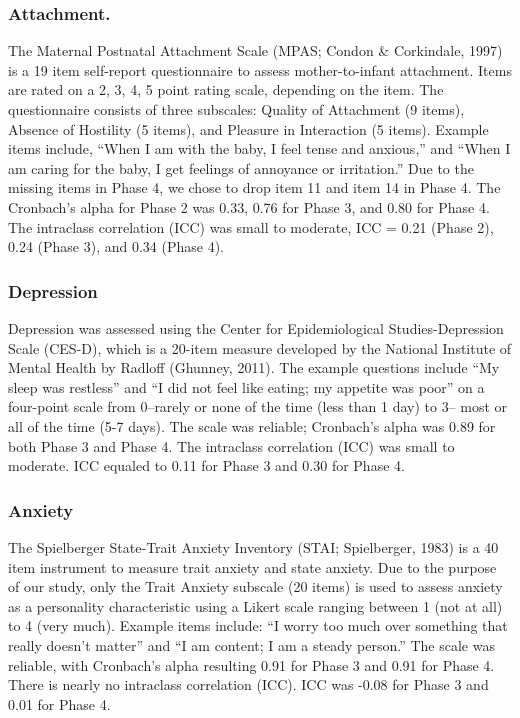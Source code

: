 \documentclass[man]{apa6}
\begin{document}
\hypertarget{attachment.}{%
\subsubsection{Attachment.}\label{attachment.}}

The Maternal Postnatal Attachment Scale (MPAS; Condon \& Corkindale, 1997) is a 19 item self-report questionnaire to assess mother-to-infant attachment. Items are rated on a 2, 3, 4, 5 point rating scale, depending on the item. The questionnaire consists of three subscales: Quality of Attachment (9 items), Absence of Hostility (5 items), and Pleasure in Interaction (5 items). Example items include, \enquote{When I am with the baby, I feel tense and anxious,} and \enquote{When I am caring for the baby, I get feelings of annoyance or irritation.} Due to the missing items in Phase 4, we chose to drop item 11 and item 14 in Phase 4. The Cronbach's alpha for Phase 2 was 0.33, 0.76 for Phase 3, and 0.80 for Phase 4. The intraclass correlation (ICC) was small to moderate, ICC = 0.21 (Phase 2), 0.24 (Phase 3), and 0.34 (Phase 4).

\hypertarget{depression}{%
\subsubsection{Depression}\label{depression}}

Depression was assessed using the Center for Epidemiological Studies-Depression Scale (CES-D), which is a 20-item measure developed by the National Institute of Mental Health by Radloff (Ghunney, 2011). The example questions include \enquote{My sleep was restless} and \enquote{I did not feel like eating; my appetite was poor} on a four-point scale from 0--rarely or none of the time (less than 1 day) to 3-- most or all of the time (5-7 days). The scale was reliable; Cronbach's alpha was 0.89 for both Phase 3 and Phase 4. The intraclass correlation (ICC) was small to moderate. ICC equaled to 0.11 for Phase 3 and 0.30 for Phase 4.

\hypertarget{anxiety}{%
\subsubsection{Anxiety}\label{anxiety}}

The Spielberger State-Trait Anxiety Inventory (STAI; Spielberger, 1983) is a 40 item instrument to measure trait anxiety and state anxiety. Due to the purpose of our study, only the Trait Anxiety subscale (20 items) is used to assess anxiety as a personality characteristic using a Likert scale ranging between 1 (not at all) to 4 (very much). Example items include: \enquote{I worry too much over something that really doesn't matter} and \enquote{I am content; I am a steady person.} The scale was reliable, with Cronbach's alpha resulting 0.91 for Phase 3 and 0.91 for Phase 4. There is nearly no intraclass correlation (ICC). ICC was -0.08 for Phase 3 and 0.01 for Phase 4.
\end{document}

